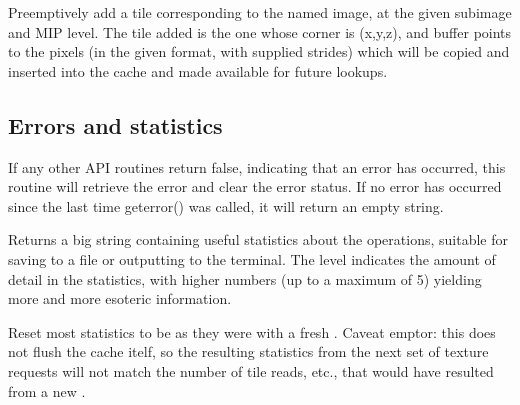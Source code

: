 \NEW  %
Preemptively add a tile corresponding to the named image, at the
given subimage and MIP level.  The tile added is the one whose
corner is (x,y,z), and buffer points to the pixels (in the given
format, with supplied strides) which will be copied and inserted
into the cache and made available for future lookups.
\apiend

\subsection{Errors and statistics}
\label{sec:imagecache:api:geterror}
\label{sec:imagecache:api:getstats}
\label{sec:imagecache:api:resetstats}

If any other API routines return {\cf false}, indicating that an error
has occurred, this routine will retrieve the error and clear the error
status.  If no error has occurred since the last time {\cf geterror()}
was called, it will return an empty string.
\apiend

Returns a big string containing useful statistics about the \ImageCache
operations, suitable for saving to a file or outputting to the terminal.
The {\cf level} indicates the amount of detail in the statistics,
with higher numbers (up to a maximum of 5) yielding more and more
esoteric information.
\apiend

Reset most statistics to be as they were with a fresh
\TextureSystem.  Caveat emptor: this does not flush the cache
itelf, so the resulting statistics from the next set of texture
requests will not match the number of tile reads, etc., that
would have resulted from a new \TextureSystem.
\apiend



\chapwidthend

